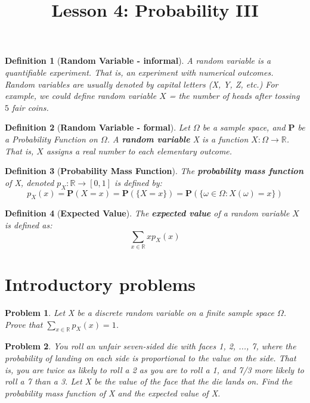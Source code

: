 \documentclass[a4paper,12pt]{article}
\title{Lesson 4: Probability III}
\theoremstyle{perfect}
\newtheorem{dfn}{Definition}
\newtheorem{prb}{Problem}
\newcommand{\R}{\mathbb{R}}
\newcommand{\PP}{\mathbf{P}}
\begin{document}
 
\maketitle


\begin{dfn}[\textbf{Random Variable - informal}]
A random variable is a quantifiable experiment. That
is, an experiment with numerical outcomes. 
Random variables are usually denoted by capital letters (X, Y, Z, etc.)
For example, we could define random variable $X$ = the number of heads
after tossing $5$ fair coins.
\end{dfn}


\begin{dfn}[\textbf{Random Variable - formal}]
Let $\Omega$ be a sample space, and $\PP$ be a Probability Function on $\Omega$. A \textbf{random variable} X is a function $X : \Omega \to \R$. That is, $X$ assigns a real number to each elementary outcome.
\end{dfn}


\begin{dfn}[\textbf{Probability Mass Function}]
The \textbf{probability mass function} of X, denoted $p_X : \R \to [0, 1]$ is defined by:
$$p_X(x) = \PP(X = x) = \PP(\{X = x\}) = \PP(\{\omega \in \Omega: X(\omega) = x\})$$
\end{dfn}

\begin{dfn}[\textbf{Expected Value}]
The \textbf{expected value} of a random variable $X$ is defined as:
$$\sum_{x \in \R} x p_X(x)$$

\end{dfn}


\section{Introductory problems}

\begin{prb}
Let X be a discrete random variable on a finite sample space $\Omega$. Prove that $\sum_{x \in \R} p_X(x) = 1$.
\end{prb}

\begin{prb}
You roll an unfair seven-sided die with faces 1, 2, ..., 7, where the probability of landing on each side is proportional to the value on the side. That is, you are twice as likely to roll a 2 as you are to roll a 1, and 7/3 more likely to roll a 7 than a 3. Let X be the value of the face that the die lands on. Find the probability mass function of X and the expected value of X.
\end{prb}
\end{document}
